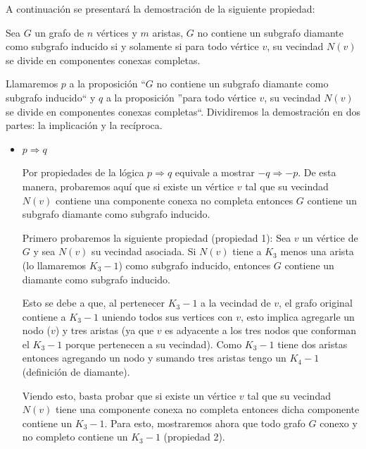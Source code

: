 \documentclass[a4paper,11pt] {article}
\begin{document}
A continuaci\'on se presentar\'a la demostraci\'on de la siguiente propiedad:

Sea $G$ un grafo de $n$ v\'ertices y $m$ aristas, $G$ no contiene un subgrafo diamante como subgrafo inducido si y solamente si para todo v\'ertice $v$, su vecindad $N(v)$ se divide en componentes conexas completas.

Llamaremos $p$ a la proposici\'on ``$G$ no contiene un subgrafo diamante como subgrafo inducido`` y $q$ a la proposici\'on ''para todo v\'ertice $v$, su vecindad $N(v)$ se divide en componentes conexas completas``. Dividiremos la demostraci\'on en dos partes: la implicaci\'on y la rec\'iproca.

\begin{itemize}
\item $p \Longrightarrow q$

Por propiedades de la l\'ogica $p \Longrightarrow q$ equivale a mostrar $-q \Longrightarrow -p$. De esta manera, probaremos aqu\'i que si existe un v\'ertice $v$ tal que su vecindad $N(v)$ contiene una componente conexa no completa entonces $G$ contiene un subgrafo diamante como subgrafo inducido.

Primero probaremos la siguiente propiedad (propiedad 1): Sea $v$ un v\'ertice de $G$ y sea $N(v)$ su vecindad asociada. Si $N(v)$ tiene a $K_{3}$ menos una arista (lo llamaremos $K_{3}-1$) como subgrafo inducido, entonces $G$ contiene un diamante como subgrafo inducido.

Esto se debe a que, al pertenecer $K_{3}-1$ a la vecindad de $v$, el grafo original contiene a $K_{3}-1$ uniendo todos sus vertices con $v$, esto implica agregarle un nodo ($v$) y tres aristas (ya que $v$ es adyacente a los tres nodos que conforman el $K_{3}-1$ porque pertenecen a su vecindad). Como $K_{3}-1$ tiene dos aristas entonces agregando un nodo y sumando tres aristas tengo un $K_{4}-1$ (definici\'on de diamante).

Viendo esto, basta probar que si existe un v\'ertice $v$ tal que su vecindad $N(v)$ tiene una componente conexa no completa entonces dicha componente contiene un $K_{3}-1$. Para esto, mostraremos ahora que todo grafo $G$ conexo y no completo contiene un $K_{3}-1$ (propiedad 2).


\end{itemize}
\end{document}
